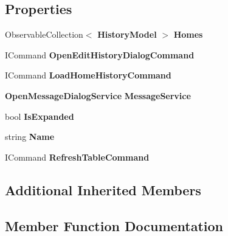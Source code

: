 \subsection*{Properties}
\begin{DoxyCompactItemize}
\item 
\mbox{\label{class_a_f_h___scheduler_1_1_history_1_1_history_v_m_a2c46178b0d9e553fe83d519b8fe92c82}} 
Observable\+Collection$<$ \textbf{ History\+Model} $>$ {\bfseries Homes}\hspace{0.3cm}{\ttfamily  [get, set]}
\item 
\mbox{\label{class_a_f_h___scheduler_1_1_history_1_1_history_v_m_a9c89be7cb9f0ef739c40721ef0e9d3cf}} 
I\+Command {\bfseries Open\+Edit\+History\+Dialog\+Command}\hspace{0.3cm}{\ttfamily  [get]}
\item 
\mbox{\label{class_a_f_h___scheduler_1_1_history_1_1_history_v_m_ae96f861081ed41cddfd5d16cbf78ee9f}} 
I\+Command {\bfseries Load\+Home\+History\+Command}\hspace{0.3cm}{\ttfamily  [get]}
\item 
\mbox{\label{class_a_f_h___scheduler_1_1_history_1_1_history_v_m_ac98860bde61ed69d0b91dfbca78ab34b}} 
\textbf{ Open\+Message\+Dialog\+Service} {\bfseries Message\+Service}\hspace{0.3cm}{\ttfamily  [get]}
\item 
\mbox{\label{class_a_f_h___scheduler_1_1_history_1_1_history_v_m_a21900f0eed24adedff2dcd498529279e}} 
bool {\bfseries Is\+Expanded}\hspace{0.3cm}{\ttfamily  [get, set]}
\item 
\mbox{\label{class_a_f_h___scheduler_1_1_history_1_1_history_v_m_a4959f6a48b98467d15f5a41835e3c7a4}} 
string {\bfseries Name}\hspace{0.3cm}{\ttfamily  [get]}
\item 
\mbox{\label{class_a_f_h___scheduler_1_1_history_1_1_history_v_m_ab89a9ebdd65b08acf8784ca5e3a7e966}} 
I\+Command {\bfseries Refresh\+Table\+Command}\hspace{0.3cm}{\ttfamily  [get]}
\end{DoxyCompactItemize}
\subsection*{Additional Inherited Members}


\subsection{Member Function Documentation}
\mbox{\label{class_a_f_h___scheduler_1_1_history_1_1_history_v_m_a877d693985c6f03639ae2888494688f2}} 

